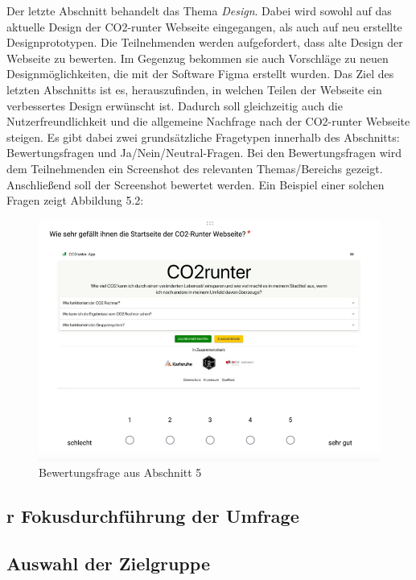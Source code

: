 Der letzte Abschnitt behandelt das Thema \textit{Design}.
Dabei wird sowohl auf das aktuelle Design der CO2-runter Webseite eingegangen, als auch auf neu erstellte Designprototypen.
Die Teilnehmenden werden aufgefordert, dass alte Design der Webseite zu bewerten.
Im Gegenzug bekommen sie auch Vorschläge zu neuen Designmöglichkeiten, die mit der Software Figma erstellt wurden.
Das Ziel des letzten Abschnitts ist es, herauszufinden, in welchen Teilen der Webseite ein verbessertes Design erwünscht ist.
Dadurch soll gleichzeitig auch die Nutzerfreundlichkeit und die allgemeine Nachfrage nach der CO2-runter Webseite steigen.
Es gibt dabei zwei grundsätzliche Fragetypen innerhalb des Abschnitts: Bewertungsfragen und Ja/Nein/Neutral-Fragen.
Bei den Bewertungsfragen wird dem Teilnehmenden ein Screenshot des relevanten Themas/Bereichs gezeigt.
Anschließend soll der Screenshot bewertet werden.
Ein Beispiel einer solchen Fragen zeigt Abbildung 5.2:
\begin{figure}[h]
    \centering
    \includegraphics[width=1\textwidth]{images/05/picture_of_evaluation_question}
    \caption{Bewertungsfrage aus Abschnitt 5}
    \label{picture-of-evaluation-question}
\end{figure}
\subsection{r Fokusdurchführung der Umfrage}

\subsection{Auswahl der Zielgruppe}

